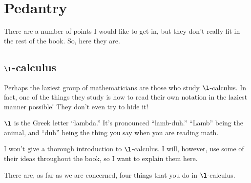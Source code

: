 \chapter{Pedantry}

There are a number of points I would like to get in, but they don't really fit
in the rest of the book. So, here they are.

\section{$\l$-calculus}

Perhaps the laziest group of mathematicians are those who study
$\l$-calculus. In fact, one of the things they study is how to read their own
notation in the laziest manner possible! They don't even try to hide it!

$\l$ is the Greek letter ``lambda.'' It's pronounced ``lamb-duh.'' ``Lamb''
being the animal, and ``duh'' being the thing you say when you are reading
math.

I won't give a thorough introduction to $\l$-calculus. I will, however, use some
of their ideas throughout the book, so I want to explain them here.

There are, as far as we are concerned, four things that you do in $\l$-calculus.

